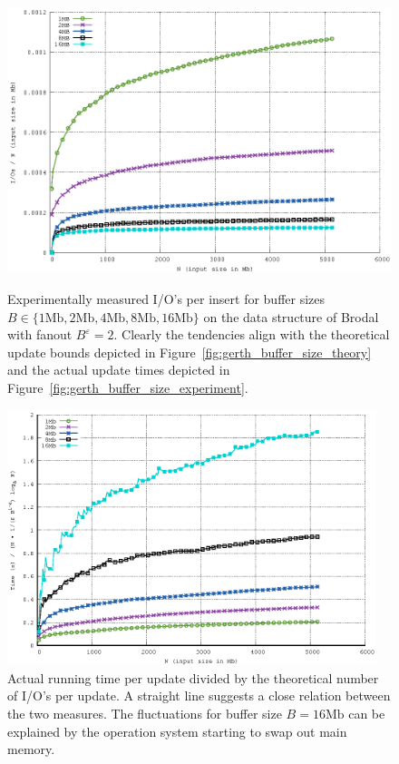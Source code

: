 \documentclass[twoside,11pt,openright]{report}
\def \epsilon {\varepsilon}
\begin{document}
\begin{figure}[htp]
\centering
\includegraphics[width=\textwidth]{../src/experiments/gerth_buffer_size_experiment_results/2016-05-03.13_51_54/io_per_insert}
\caption{Experimentally measured I/O's per insert for buffer sizes \\ $B \in \{1 \text{Mb}, 2 \text{Mb}, 4 \text{Mb}, 8 \text{Mb}, 16 \text{Mb} \}$ on the data structure of Brodal with fanout $B^\epsilon = 2$. Clearly the tendencies align with the theoretical update bounds depicted in Figure~\ref{fig:gerth_buffer_size_theory} and the actual update times depicted in Figure~\ref{fig:gerth_buffer_size_experiment}.}
\label{fig:gerth_buffer_size_experiment_ios_per_insert}

\includegraphics[width=0.96\textwidth]{../src/experiments/gerth_buffer_size_experiment_results/2016-05-03.13_51_54/time_divided_asymptotic}
\caption{Actual running time per update divided by the theoretical number of I/O's per update. A straight line suggests a close relation between the two measures. The fluctuations for buffer size $B = 16 \text{Mb}$ can be explained by the operation system starting to swap out main memory.}
\label{fig:gerth_buffer_size_experiment_time_divided_asymptotic}
\end{figure}
\end{document}
